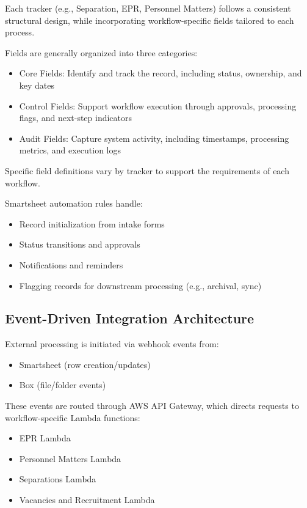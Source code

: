 \documentclass[12pt]{article}
\def\textbf#1{#1}%
\def\&{ and }%
\begin{document}
Each tracker (e.g., Separation, EPR, Personnel Matters) follows a consistent structural design, while incorporating workflow-specific fields tailored to each process.

Fields are generally organized into three categories:

\begin{itemize}
    \item \textbf{Core Fields:} Identify and track the record, including status, ownership, and key dates
    \item \textbf{Control Fields:} Support workflow execution through approvals, processing flags, and next-step indicators
    \item \textbf{Audit Fields:} Capture system activity, including timestamps, processing metrics, and execution logs
\end{itemize}

Specific field definitions vary by tracker to support the requirements of each workflow.

Smartsheet automation rules handle:

\begin{itemize}
    \item Record initialization from intake forms
    \item Status transitions and approvals
    \item Notifications and reminders
    \item Flagging records for downstream processing (e.g., archival, sync)
\end{itemize}

\subsection{Event-Driven Integration Architecture}

External processing is initiated via webhook events from:

\begin{itemize}
    \item Smartsheet (row creation/updates)
    \item Box (file/folder events)
\end{itemize}

These events are routed through AWS API Gateway, which directs requests to workflow-specific Lambda functions:

\begin{itemize}
    \item EPR Lambda
    \item Personnel Matters Lambda
    \item Separations Lambda
    \item Vacancies \& Recruitment Lambda
\end{itemize}
\end{document}
